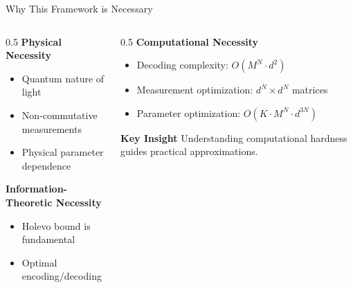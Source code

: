 \documentclass[10pt]{beamer}
\begin{document}
\begin{frame}{Why This Framework is Necessary}
\begin{columns}
\begin{column}{0.5\textwidth}
\textbf{Physical Necessity}
\begin{itemize}
\item Quantum nature of light
\item Non-commutative measurements
\item Physical parameter dependence
\end{itemize}

\textbf{Information-Theoretic Necessity}
\begin{itemize}
\item Holevo bound is fundamental
\item Optimal encoding/decoding
\end{itemize}
\end{column}

\begin{column}{0.5\textwidth}
\textbf{Computational Necessity}
\begin{itemize}
\item Decoding complexity: $O(M^N \cdot d^2)$
\item Measurement optimization: $d^N \times d^N$ matrices
\item Parameter optimization: $O(K \cdot M^N \cdot d^{3N})$
\end{itemize}

\textbf{Key Insight}
Understanding computational hardness guides practical approximations.
\end{column}
\end{columns}
\end{frame}
\end{document}

